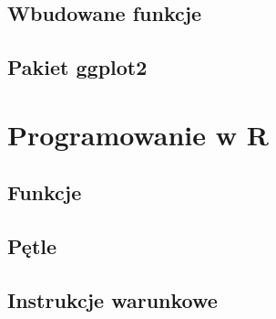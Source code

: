 \documentclass[]{book}
\begin{document}
\section{Wbudowane funkcje}\label{wbudowane-funkcje}

\section{Pakiet ggplot2}\label{pakiet-ggplot2}

\chapter{Programowanie w R}\label{programowanie-w-r}

\section{Funkcje}\label{funkcje}

\section{Pętle}\label{petle}

\section{Instrukcje warunkowe}\label{instrukcje-warunkowe}
\end{document}
